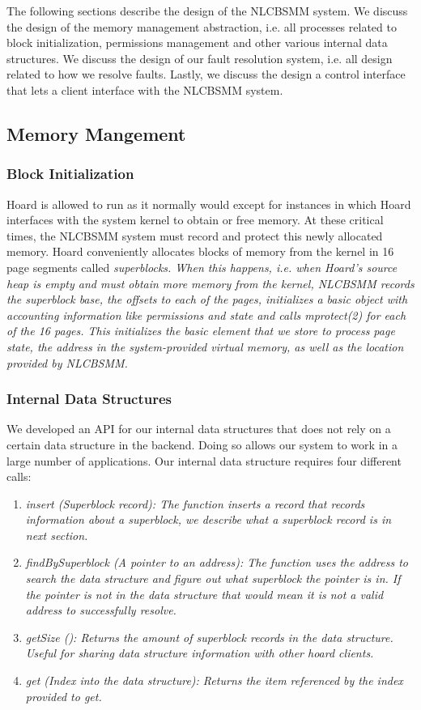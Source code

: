 \documentclass[9pt]{sig-alternate-10pt}
\begin{document}
The following sections describe the design of the NLCBSMM system.  We discuss the design of the memory management abstraction, i.e. all processes related to block initialization, permissions management and other various internal data structures.  We discuss the design of our fault resolution system, i.e. all design related to how we resolve faults. Lastly, we discuss the design a control interface that lets a client interface with the NLCBSMM system.

\subsection{Memory Mangement}
\subsubsection{Block Initialization}
Hoard is allowed to run as it normally would except for instances in which Hoard interfaces with the system kernel to obtain or free memory.  At these critical times, the NLCBSMM system must record and protect this newly allocated memory.  Hoard conveniently allocates blocks of memory from the kernel in 16 page segments called \em superblocks\em.  When this happens, i.e. when Hoard's \em source heap \em is empty and must obtain more memory from the kernel, NLCBSMM records the superblock base, the offsets to each of the pages, initializes a basic object with accounting information like permissions and state and calls mprotect(2) for each of the 16 pages.  This initializes the basic element that we store to process page state, the address in the system-provided virtual memory, as well as the location provided by NLCBSMM.

\subsubsection{Internal Data Structures}
We developed an API for our internal data structures that does not rely on a certain data structure in the backend. Doing so allows our system to work in a large number of applications. Our internal data structure requires four different calls:
\begin{enumerate}
\item \em insert \em (Superblock record): The function inserts a record that records information about a superblock, we describe what a superblock record is in next section.
\item \em findBySuperblock \em (A pointer to an address): The function uses the address to search the data structure and figure out what superblock the pointer is in. If the pointer is not in the data structure that would mean it is not a valid address to successfully resolve.
\item \em getSize \em (): Returns the amount of superblock records in the data structure. Useful for sharing data structure information with other hoard clients.
\item \em get \em (Index into the data structure): Returns the item referenced by the index provided to get.
\end{enumerate}
\end{document}

